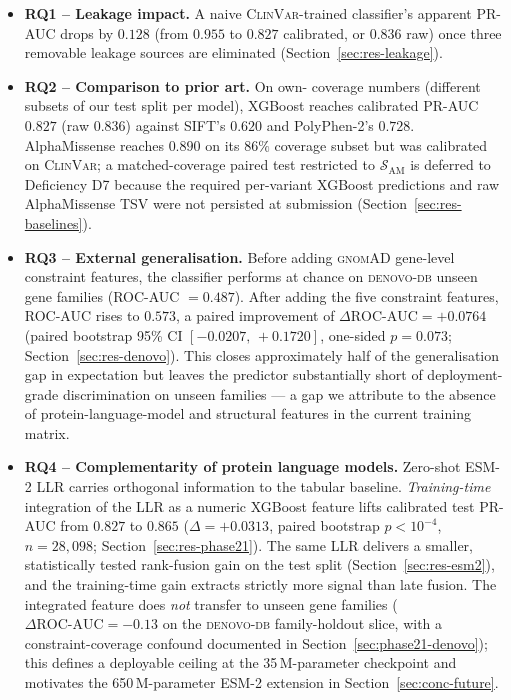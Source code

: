 \documentclass[11pt,a4paper,oneside]{report}
\begin{document}
\begin{itemize}[leftmargin=1.5em, itemsep=0.2em]
\item \textbf{RQ1 -- Leakage impact.} A naive
\textsc{ClinVar}-trained classifier's apparent PR-AUC drops
by $0.128$ (from $0.955$ to $0.827$ calibrated, or
$0.836$ raw) once three removable leakage sources are
eliminated (Section~\ref{sec:res-leakage}).
\item \textbf{RQ2 -- Comparison to prior art.} On own-
coverage numbers (different subsets of our test split
per model), XGBoost reaches calibrated PR-AUC $0.827$
(raw $0.836$) against SIFT's $0.620$ and PolyPhen-2's
$0.728$. AlphaMissense reaches
$0.890$ on its $86\%$ coverage subset but was calibrated
on \textsc{ClinVar}; a matched-coverage paired test
restricted to $\mathcal{S}_{\text{AM}}$ is deferred to
Deficiency D7 because the required per-variant XGBoost
predictions and raw AlphaMissense TSV were not persisted
at submission (Section~\ref{sec:res-baselines}).
\item \textbf{RQ3 -- External generalisation.} Before
adding \textsc{gnomAD} gene-level constraint features, the
classifier performs at chance on \textsc{denovo-db}
unseen gene families (ROC-AUC $= 0.487$). After adding
the five constraint features, ROC-AUC rises to $0.573$,
a paired improvement of $\Delta\text{ROC-AUC}=+0.0764$
(paired bootstrap 95\% CI $[-0.0207,\,+0.1720]$,
one-sided $p=0.073$;
Section~\ref{sec:res-denovo}). This closes approximately
half of the generalisation gap in expectation but leaves
the predictor substantially short of deployment-grade
discrimination on unseen families --- a gap we attribute
to the absence of protein-language-model and structural
features in the current training matrix.
\item \textbf{RQ4 -- Complementarity of protein language
models.} Zero-shot ESM-2 LLR carries orthogonal
information to the tabular baseline. \emph{Training-time}
integration of the LLR as a numeric XGBoost feature lifts
calibrated test PR-AUC from $0.827$ to $0.865$
($\Delta=+0.0313$, paired bootstrap $p<10^{-4}$, $n=28{,}098$;
Section~\ref{sec:res-phase21}). The same LLR delivers a
smaller, statistically tested rank-fusion gain on the
test split (Section~\ref{sec:res-esm2}), and the
training-time gain extracts strictly more signal than late
fusion. The integrated feature does \emph{not} transfer
to unseen gene families ($\Delta\text{ROC-AUC}=-0.13$ on
the \textsc{denovo-db} family-holdout slice, with a
constraint-coverage confound documented in
Section~\ref{sec:phase21-denovo}); this defines a
deployable ceiling at the 35\,M-parameter checkpoint and
motivates the 650\,M-parameter ESM-2 extension in
Section~\ref{sec:conc-future}.
\end{itemize}
\end{document}
